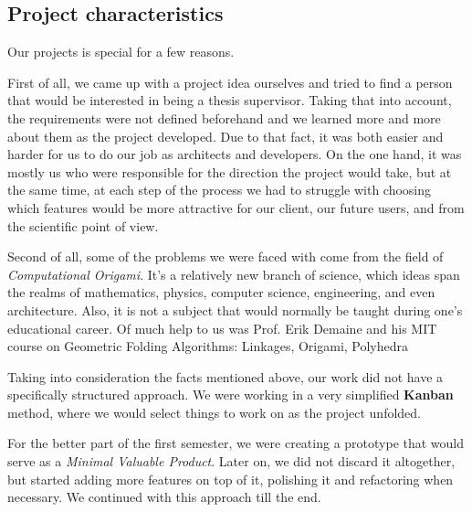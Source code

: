 \subsection{Project characteristics}

Our projects is special for a few reasons.

First of all, we came up with a project idea ourselves and tried to find a person that would be interested in being a thesis supervisor.
Taking that into account, the requirements were not defined beforehand
and we learned more and more about them as the project developed.
Due to that fact, it was both easier and harder for us to do our job as architects and developers.
On the one hand, it was mostly us who were responsible for the direction the project would take, but at the same time, at each step of the process
we had to struggle with choosing which features would be more attractive for our client, our future users, and from the scientific point of view.

Second of all, some of the problems we were faced with come from the field of \textit{Computational Origami}.
It's a relatively new branch of science, which ideas span the realms of mathematics, physics, 
computer science, engineering, and even architecture.
Also, it is not a subject that would normally be taught during one's educational career.
Of much help to us was Prof. Erik Demaine and his MIT course on Geometric Folding Algorithms: Linkages, Origami, Polyhedra \cite{mit-course}
\smallskip

Taking into consideration the facts mentioned above, our work did not have a specifically structured approach.
We were working in a very simplified \textbf{Kanban} method, where we would select things to work on
as the project unfolded. 
\smallskip

For the better part of the first semester,
we were creating a prototype that would serve as a \textit{Minimal Valuable Product}.
Later on, we did not discard it altogether, but started adding more features on top of it,
polishing it and refactoring when necessary. 
We continued with this approach till the end.

